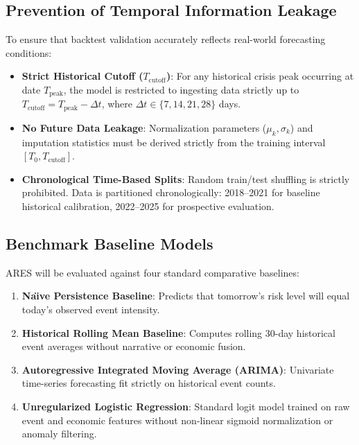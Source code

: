 \documentclass[preprint,12pt]{elsarticle}
\begin{document}
\subsection{Prevention of Temporal Information Leakage}
To ensure that backtest validation accurately reflects real-world forecasting conditions:
\begin{itemize}
    \item \textbf{Strict Historical Cutoff ($T_{\text{cutoff}}$)}: For any historical crisis peak occurring at date $T_{\text{peak}}$, the model is restricted to ingesting data strictly up to $T_{\text{cutoff}} = T_{\text{peak}} - \Delta t$, where $\Delta t \in \{7, 14, 21, 28\}$ days.
    \item \textbf{No Future Data Leakage}: Normalization parameters ($\mu_k, \sigma_k$) and imputation statistics must be derived strictly from the training interval $[T_0, T_{\text{cutoff}}]$.
    \item \textbf{Chronological Time-Based Splits}: Random train/test shuffling is strictly prohibited. Data is partitioned chronologically: 2018--2021 for baseline historical calibration, 2022--2025 for prospective evaluation.
\end{itemize}

\subsection{Benchmark Baseline Models}
ARES will be evaluated against four standard comparative baselines:
\begin{enumerate}
    \item \textbf{Na\"{\i}ve Persistence Baseline}: Predicts that tomorrow's risk level will equal today's observed event intensity.
    \item \textbf{Historical Rolling Mean Baseline}: Computes rolling 30-day historical event averages without narrative or economic fusion.
    \item \textbf{Autoregressive Integrated Moving Average (ARIMA)}: Univariate time-series forecasting fit strictly on historical event counts.
    \item \textbf{Unregularized Logistic Regression}: Standard logit model trained on raw event and economic features without non-linear sigmoid normalization or anomaly filtering.
\end{enumerate}
\end{document}
